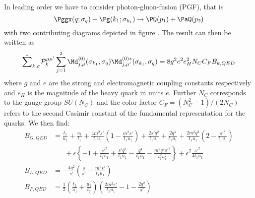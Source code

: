 In leading order we have to consider photon-gluon-fusion (PGF), that is
\begin{equation}
\Pggx(q;\sigma_q) + \Pg(k_1;\sigma_{k_1}) \rightarrow \PQ(p_1)+\PaQ(p_2)
\end{equation}
with two contributing diagrams depicted in figure . The result can then be written as
\begin{equation}
\hat\sum_{k,\sigma}\mathcal P_{k}^{\mu\mu'}\sum_{j=1}^2\Md^{(0)}_{j,\mu}(\sigma_{k_1},\sigma_q)\Md^{(0)*}_{j,\mu'}(\sigma_{k_1},\sigma_q) = 8g^2e^2e_H^2 N_C C_F B_{k,QED}
\end{equation}
where $g$ and $e$ are the strong and electromagnetic coupling constants respectively and $e_H$ is the magnitude of the heavy quark in units $e$. Further $N_C$ corresponds to the gauge group $SU(N_C)$ and the color factor $C_F=(N_C^2-1)/(2N_C)$ refers to the second Casimir constant of the fundamental representation for the quarks. We then find:
\begin{align}
B_{G,QED} &= \frac{t_1}{u_1} + \frac{u_1}{t_1} + \frac{4m^2s'}{t_1u_1}\left(1-\frac{m^2s'}{t_1u_1}\right)
+\frac{2s'q^2}{t_1u_1} +\frac{2q^4}{t_1u_1} + \frac{2m^2q^2}{t_1u_1}\left(2-\frac{{s'}^2}{t_1u_1}\right)\nonumber\\
 &\hspace{20pt}+\epsilon\left\{ -1 + \frac{{s'}^2}{t_1u_1} + \frac{s'q^2}{t_1u_1} -
\frac{q^4}{t_1u_1} - \frac{m^2q^2{s'}^2}{t_1^2u_1^2} \right\} + \epsilon^2\frac{{s'}^2}{4t_1u_1}\\
B_{L,QED} &= -\frac{4q^2}{s'}\left(\frac s {s'} - \frac{m^2s'}{t_1u_1}\right)\\
B_{P,QED} &= \frac 1 2\left(\frac{t_1}{u_1}+\frac{u_1}{t_1}\right)\left(\frac{2m^2 s'}{t_1u_1}-1 - \frac{2q^2}{s'}\right)
\end{align}

